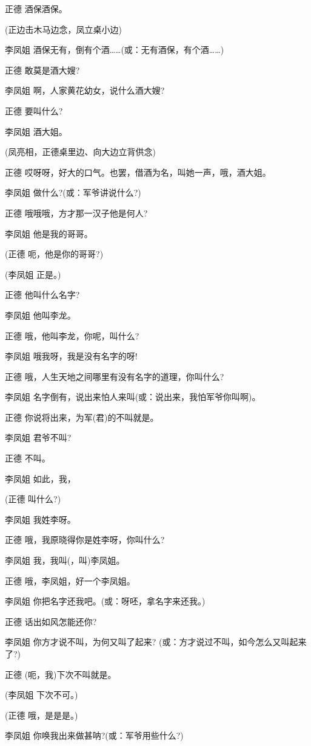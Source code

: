 正德 酒保酒保。

(正边击木马边念，凤立桌小边)

李凤姐
酒保无有，倒有个酒\ldots{}\ldots{}(或：无有酒保，有个酒\ldots{}\ldots{})

正德 敢莫是酒大嫂?

李凤姐 啊，人家黄花幼女，说什么酒大嫂?

正德 要叫什么?

李凤姐 酒大姐。

(凤亮相，正德桌里边、向大边立背供念)

正德 哎呀呀，好大的口气。也罢，借酒为名，叫她一声，哦，酒大姐。

李凤姐 做什么?(或：军爷讲说什么?)

正德 哦哦哦，方才那一汉子他是何人?

李凤姐 他是我的哥哥。

(正德 呃，他是你的哥哥?)

(李凤姐 正是。)

正德 他叫什么名字?

李凤姐 他叫李龙。

正德 哦，他叫李龙，你呢，叫什么?

李凤姐 哦我呀，我是没有名字的呀!

正德 哦，人生天地之间哪里有没有名字的道理，你叫什么?

李凤姐 名字倒有，说出来怕人来叫(或：说出来，我怕军爷你叫啊)。

正德 你说将出来，为军(君)的不叫就是。

李凤姐 君爷不叫?

正德 不叫。

李凤姐 如此，我，

(正德 叫什么?)

李凤姐 我姓李呀。

正德 哦，我原晓得你是姓李呀，你叫什么?

李凤姐 我，我叫(，叫)李凤姐。

正德 哦，李凤姐，好一个李凤姐。

李凤姐 你把名字还我吧。(或：呀呸，拿名字来还我。)

正德 话出如风怎能还你?

李凤姐 你方才说不叫，为何又叫了起来?
(或：方才说过不叫，如今怎么又叫起来了?)

正德 (呃，我)下次不叫就是。

(李凤姐 下次不可。)

(正德 哦，是是是。)

李凤姐 你唤我出来做甚呐?(或：军爷用些什么?)

